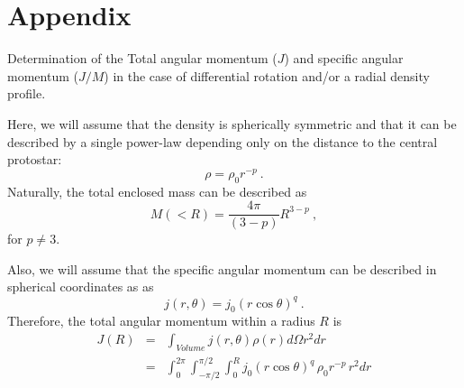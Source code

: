 \section{Appendix}
Determination of the Total angular momentum ($J$) and specific angular momentum ($J/M$) in the case of differential rotation and/or a radial density profile.

Here, we will assume that the density is spherically symmetric and that it can be described 
by a single power-law depending only on the distance to the central protostar:
\begin{equation}
\rho = \rho_0 r^{-p}~. \label{eq:density}
\end{equation}
Naturally, the total enclosed mass can be described as 
\begin{equation}
M(<R) = \frac{4\pi}{(3-p)} R^{3-p}~,
\end{equation}
for $p\ne 3$.

Also, we will assume that the specific angular momentum can be described in spherical coordinates as as
\begin{equation}
j(r,\theta) = j_0 ( r \cos \theta)^q~.
\end{equation}
Therefore, the total angular momentum within a radius $R$ is
\begin{eqnarray}
J(R) &=& \int_{Volume} j(r,\theta) \rho(r) d\Omega r^2 dr \\
&=& \int_0^{2\pi}\int_{-\pi/2}^{\pi/2}\int_0^R j_0 ( r \cos \theta)^q\, \rho_0 r^{-p}\, r^2 dr 
\end{eqnarray}
  